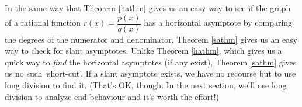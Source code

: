 \medskip

In the same way that Theorem \ref{hathm} gives us an easy way to see if the graph of a rational function $r(x) = \dfrac{p(x)}{q(x)}$ has a horizontal asymptote by comparing the degrees of the numerator and denominator, Theorem \ref{sathm} gives us an easy way to check for slant asymptotes.  Unlike Theorem \ref{hathm}, which gives us a quick way to \textit{find} the horizontal asymptotes (if any exist), Theorem \ref{sathm} gives us no such `short-cut'.  If a slant asymptote exists, we have no recourse but to use long division to find it. (That's OK, though.  In the next section, we'll use long division to analyze end behaviour and it's worth the effort!)

\medskip

